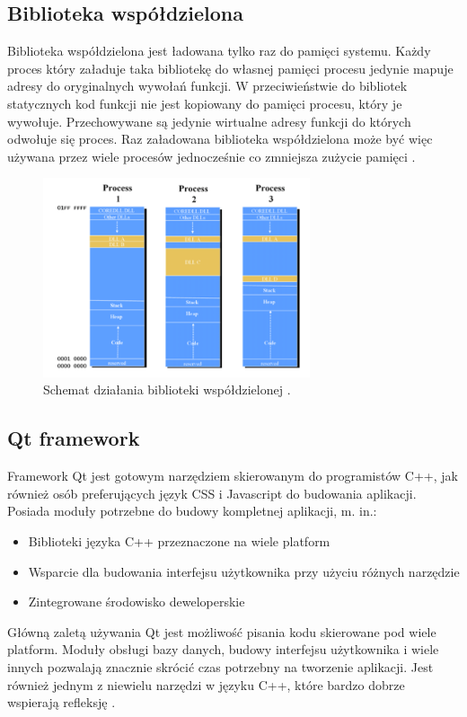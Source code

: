 \documentclass[12pt]{report}
\begin{document}
\subsection{Biblioteka współdzielona}
	\indent Biblioteka współdzielona jest ładowana tylko raz do pamięci systemu. Każdy proces który załaduje taka bibliotekę do własnej pamięci procesu jedynie mapuje adresy do oryginalnych wywołań funkcji. W przeciwieństwie do bibliotek statycznych kod funkcji nie jest kopiowany do pamięci procesu, który je wywołuje. Przechowywane są jedynie wirtualne adresy funkcji do których odwołuje się proces. Raz załadowana biblioteka współdzielona może być więc używana przez wiele procesów jednocześnie co zmniejsza zużycie pamięci \cite{dll}.
\begin{figure}[h]
	\centering
	\includegraphics[width=0.7\textwidth]{images/dll.png}
	\caption{Schemat działania biblioteki współdzielonej \cite{dllimg}.}
\end{figure}
\FloatBarrier
\subsection{Qt framework}
	\indent Framework Qt jest gotowym narzędziem skierowanym do programistów C++, jak również osób preferujących język CSS i Javascript do budowania aplikacji. Posiada moduły potrzebne do budowy kompletnej aplikacji, m. in.:
	\begin{itemize}
	\item Biblioteki języka C++ przeznaczone na wiele platform
	\item Wsparcie dla budowania interfejsu użytkownika przy użyciu różnych narzędzie
	\item Zintegrowane środowisko deweloperskie
	\end{itemize}
	\indent Główną zaletą używania Qt jest możliwość pisania kodu skierowane pod wiele platform. Moduły obsługi bazy danych, budowy interfejsu użytkownika i wiele innych pozwalają znacznie skrócić czas potrzebny na tworzenie aplikacji. Jest również jednym z niewielu narzędzi w języku C++, które bardzo dobrze wspierają refleksję \cite{qtframework}.
\end{document}
